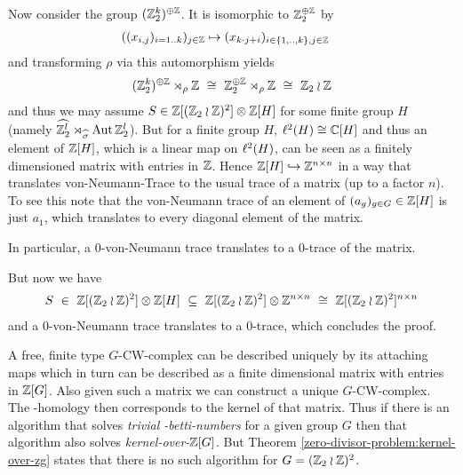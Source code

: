 	Now consider the group $(\mathbb{Z}_2^k)^{\oplus\mathbb{Z}}$. It is isomorphic to $\mathbb{Z}_2^{\oplus \mathbb{Z}}$ by
	\begin{align*}
		& ((x_{i,j})_{i = 1 .. k})_{j \in \mathbb{Z}} \mapsto (x_{k \cdot j + i})_{i \in \{1,..,k\}, j \in \mathbb{Z}}
	\end{align*}
	and transforming $\rho$ via this automorphism yields
	\begin{align*}
		(\mathbb{Z}_2^k)^{\oplus\mathbb{Z}} \rtimes_\rho \mathbb{Z} ~\cong~ \mathbb{Z}_2^{\oplus\mathbb{Z}} \rtimes_{\rho} \mathbb{Z} ~\cong~ \mathbb{Z}_2 \wr \mathbb{Z}
	\end{align*}
	and thus we may assume $S \in \mathbb{Z}[(\mathbb{Z}_2 \wr \mathbb{Z})^2] \otimes \mathbb{Z}[H]$ for some finite group $H$ (namely $\widehat{\mathbb{Z}_2^l} \rtimes_{\widehat\sigma} \operatorname{Aut} \mathbb{Z}_2^l$).
	But for a finite group $H$, $\ell^2(H) \cong \mathbb{C}[H]$ and thus an element of $\mathbb{Z}[H]$, which is a linear map on $\ell^2(H)$, can be seen as a finitely dimensioned matrix with entries in $\mathbb{Z}$.
	Hence $\mathbb{Z}[H] \hookrightarrow \mathbb{Z}^{n \times n}$ in a way that translates von-Neumann-Trace to the usual trace of a matrix (up to a factor $n$).
	To see this note that the von-Neumann trace of an element of $(a_g)_{g \in G} \in \mathbb{Z}[H]$ is just $a_1$, which translates to every diagonal element of the matrix.

	In particular, a $0$-von-Neumann trace translates to a $0$-trace of the matrix.

	But now we have
	\begin{align*}
		S ~\in~ \mathbb{Z}[(\mathbb{Z}_2 \wr \mathbb{Z})^2] \otimes \mathbb{Z}[H] ~\subseteq~ \mathbb{Z}[(\mathbb{Z}_2 \wr \mathbb{Z})^2] \otimes \mathbb{Z}^{n \times n} ~\cong~ \mathbb{Z}[(\mathbb{Z}_2 \wr \mathbb{Z})^2]^{n \times n}
	\end{align*}
	and a $0$-von-Neumann trace translates to a $0$-trace, which concludes the proof.
\endproof

	A free, finite type $G$-CW-complex can be described uniquely by its attaching maps which in turn can be described as a finite dimensional matrix with entries in $\mathbb{Z}[G]$. Also given such a matrix we can construct a unique $G$-CW-complex. The \ltwo-homology then corresponds to the kernel of that matrix.
	Thus if there is an algorithm that solves \emph{trivial \ltwo-betti-numbers} for a given group $G$ then that algorithm also solves \emph{kernel-over-$\mathbb{Z}[G]$}. But Theorem \ref{zero-divisor-problem:kernel-over-zg} states that there is no such algorithm for $G = (\mathbb{Z}_2 \wr \mathbb{Z})^2$.
\endproof

